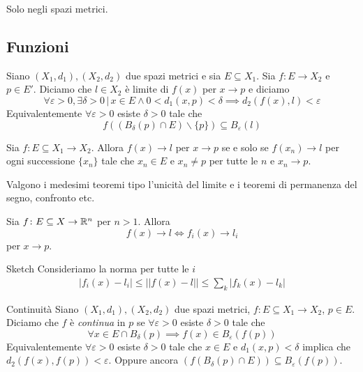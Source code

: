 \documentclass[a4paper]{article}
\begin{document}
Solo negli spazi metrici.

\subsection{Funzioni}

\begin{snippetdefinition}{}
    Siano \((X_1, d_1), (X_2, d_2)\) due spazi metrici e sia \(E \subseteq X_1\).
    Sia \(f \colon E \to X_2\) e \(p \in E'\).
    Diciamo che \(l\in X_2\) è limite di \(f(x)\) per \(x\to p\) e diciamo
    \[
        \forall \varepsilon > 0, \exists \delta > 0 \,|\, x \in E
        \land 0 < d_1(x, p) < \delta \implies d_2(f(x), l) < \varepsilon
    \]
    Equivalentemente \(\forall \varepsilon >0\) esiste \(\delta > 0\)
    tale che \[f((B_\delta(p) \cap E) \backslash \{p\}) \subseteq B_\varepsilon(l)\]
\end{snippetdefinition}

\begin{snippetproposition}{}
    Sia \(f\colon E \subseteq X_1 \to X_2\).
    Allora \(f(x) \to l\) per \(x\to p\) se e solo se \(f(x_n) \to l\)
    per ogni successione \(\{x_n\}\) tale che \(x_n \in E\) e \(x_n \neq p\)
    per tutte le \(n\) e \(x_n \to p\).
\end{snippetproposition}

Valgono i medesimi teoremi tipo l'unicità del limite e i teoremi di permanenza del segno, confronto etc.

\begin{snippetproposition}{}
    Sia \(f \colon E \subseteq X \to \mathbb{R}^n\) per \(n > 1\).
    Allora
    \[
        f(x) \to l \iff f_i(x) \to l_i
    \]
    per \(x \to p\).
\end{snippetproposition}

\begin{snippetproof}{Sketch}
    Consideriamo la norma per tutte le \(i\)
    \begin{align*}
        |f_i(x)-l_i| \leq ||f(x) - l|| \leq \sum_k |f_k(x) - l_k|
    \end{align*}
\end{snippetproof}

\begin{snippetdefinition}{Continuità}
    Siano \((X_1, d_1), (X_2, d_2)\) due spazi metrici,
    \(f \colon E \subseteq X_1 \to X_2\), \(p \in E\).
    Diciamo che \(f\) è \emph{continua} in \(p\)
    se \(\forall \varepsilon > 0\) esiste \(\delta > 0\) tale che
    \[\forall x \in E \cap B_\delta(p) \implies f(x) \in B_\varepsilon(f(p))\]
    Equivalentemente \(\forall \varepsilon > 0\) esiste \(\delta > 0\)
    tale che \(x\in E\) e \(d_1(x,p) <\delta\) implica che \(d_2(f(x), f(p)) < \varepsilon\).
    Oppure ancora \((f(B_\delta(p) \cap E)) \subseteq B_\varepsilon(f(p))\).
\end{snippetdefinition}
\end{document}
